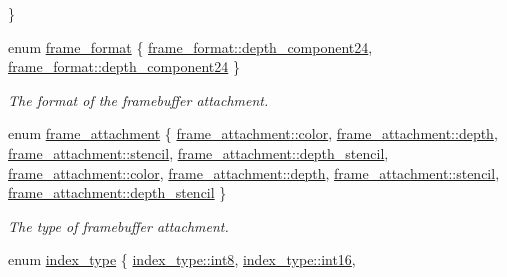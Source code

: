 \begin{DoxyCompactItemize}
 \}
\item 
enum \mbox{\hyperlink{namespacemoka_a2ce6b5e22cd8e423713ef76033a279de}{frame\+\_\+format}} \{ \mbox{\hyperlink{namespacemoka_a2ce6b5e22cd8e423713ef76033a279deae7967c21c483439cf58d7a68124a80ea}{frame\+\_\+format\+::depth\+\_\+component24}}, 
\mbox{\hyperlink{namespacemoka_a2ce6b5e22cd8e423713ef76033a279deae7967c21c483439cf58d7a68124a80ea}{frame\+\_\+format\+::depth\+\_\+component24}}
 \}
\begin{DoxyCompactList}\small\item\em The format of the framebuffer attachment. \end{DoxyCompactList}\item 
enum \mbox{\hyperlink{namespacemoka_a0a44ecbb877dec1107d9915dc95c58d1}{frame\+\_\+attachment}} \{ \newline
\mbox{\hyperlink{namespacemoka_a0a44ecbb877dec1107d9915dc95c58d1a70dda5dfb8053dc6d1c492574bce9bfd}{frame\+\_\+attachment\+::color}}, 
\mbox{\hyperlink{namespacemoka_a0a44ecbb877dec1107d9915dc95c58d1a12a055bf01a31369fe81ac35d85c7bc1}{frame\+\_\+attachment\+::depth}}, 
\mbox{\hyperlink{namespacemoka_a0a44ecbb877dec1107d9915dc95c58d1a667f218c5ed2c9cf25734500472e7c4a}{frame\+\_\+attachment\+::stencil}}, 
\mbox{\hyperlink{namespacemoka_a0a44ecbb877dec1107d9915dc95c58d1a4cc2150334d039ce9f2a6b7e8e285e3e}{frame\+\_\+attachment\+::depth\+\_\+stencil}}, 
\newline
\mbox{\hyperlink{namespacemoka_a0a44ecbb877dec1107d9915dc95c58d1a70dda5dfb8053dc6d1c492574bce9bfd}{frame\+\_\+attachment\+::color}}, 
\mbox{\hyperlink{namespacemoka_a0a44ecbb877dec1107d9915dc95c58d1a12a055bf01a31369fe81ac35d85c7bc1}{frame\+\_\+attachment\+::depth}}, 
\mbox{\hyperlink{namespacemoka_a0a44ecbb877dec1107d9915dc95c58d1a667f218c5ed2c9cf25734500472e7c4a}{frame\+\_\+attachment\+::stencil}}, 
\mbox{\hyperlink{namespacemoka_a0a44ecbb877dec1107d9915dc95c58d1a4cc2150334d039ce9f2a6b7e8e285e3e}{frame\+\_\+attachment\+::depth\+\_\+stencil}}
 \}
\begin{DoxyCompactList}\small\item\em The type of framebuffer attachment. \end{DoxyCompactList}\item 
enum \mbox{\hyperlink{namespacemoka_a32244b0de63481283738e2db11639e3f}{index\+\_\+type}} \{ \newline
\mbox{\hyperlink{namespacemoka_a32244b0de63481283738e2db11639e3fa27c006cc56b1ba88f960cf8b5144fcac}{index\+\_\+type\+::int8}}, 
\mbox{\hyperlink{namespacemoka_a32244b0de63481283738e2db11639e3face80d5ec65b1d2a2f1049eadc100db23}{index\+\_\+type\+::int16}}, 

\end{DoxyCompactItemize}
